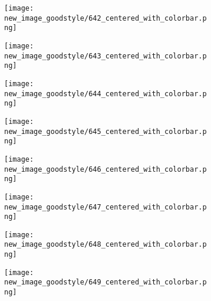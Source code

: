 \documentclass[a4paper,12pt]{article}
\begin{document}
\begin{figure}[H]
  \begin{subfigure}{0.11\textwidth}
    \texttt{[image: new\_image\_goodstyle/642\_centered\_with\_colorbar.png]}
  \end{subfigure}
  \hfill
  \begin{subfigure}{0.11\textwidth}
    \texttt{[image: new\_image\_goodstyle/643\_centered\_with\_colorbar.png]}
  \end{subfigure}
  \hfill
  \begin{subfigure}{0.11\textwidth}
    \texttt{[image: new\_image\_goodstyle/644\_centered\_with\_colorbar.png]}
  \end{subfigure}
  \hfill
  \begin{subfigure}{0.11\textwidth}
    \texttt{[image: new\_image\_goodstyle/645\_centered\_with\_colorbar.png]}
  \end{subfigure}
  \hfill
  \begin{subfigure}{0.11\textwidth}
    \texttt{[image: new\_image\_goodstyle/646\_centered\_with\_colorbar.png]}
  \end{subfigure}
  \hfill
  \begin{subfigure}{0.11\textwidth}
    \texttt{[image: new\_image\_goodstyle/647\_centered\_with\_colorbar.png]}
  \end{subfigure}
  \hfill
  \begin{subfigure}{0.11\textwidth}
    \texttt{[image: new\_image\_goodstyle/648\_centered\_with\_colorbar.png]}
  \end{subfigure}
  \hfill
  \begin{subfigure}{0.11\textwidth}
    \texttt{[image: new\_image\_goodstyle/649\_centered\_with\_colorbar.png]}
  \end{subfigure}
  \hfill
\end{figure}
\end{document}
